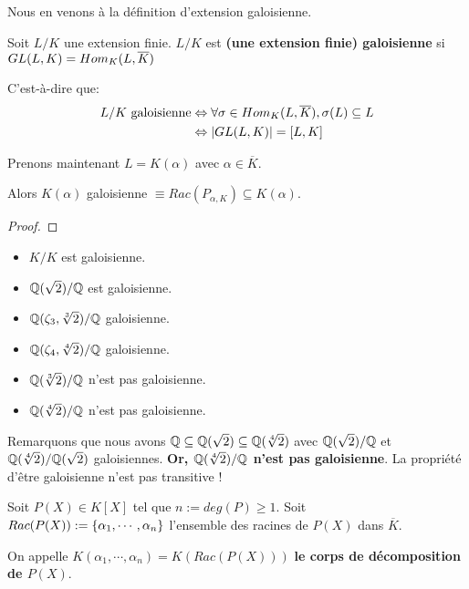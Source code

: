 Nous en venons à la définition d'extension galoisienne.

\begin{definition}
	Soit $L/K$ une extension finie.
	$L/K$ est \textbf{(une extension finie) galoisienne} si $GL(L, K) =
	Hom_{K}(L, \overline{K})$
\end{definition}

C'est-à-dire que:
\begin{align*}
	L/K \text{ galoisienne}
	& \Leftrightarrow \forall \sigma \in Hom_{K}(L, \overline{K}), \sigma(L) \subseteq L \\
	& \Leftrightarrow |GL(L, K)| = [L, K]
\end{align*}

\begin{proposition}
	Prenons maintenant $L = K(\alpha)$ avec $\alpha \in \overline{K}$.

	Alors $K(\alpha)$ galoisienne $\equiv Rac(P_{\alpha, K}) \subseteq K(\alpha)$.
\end{proposition}

\ifdefined\outputproof
\begin{proof}

\end{proof}
\fi

\begin{exemple} [Exercice]
	\begin{itemize}
		\item $K/K$ est galoisienne.
		\item $\mathbb{Q}(\sqrt{2})/\mathbb{Q}$ est galoisienne.
		\item $\mathbb{Q}(\zeta_{3}, \sqrt[3]{2})/\mathbb{Q}$ galoisienne.
		\item $\mathbb{Q}(\zeta_{4}, \sqrt[4]{2})/\mathbb{Q}$ galoisienne.
		\item $\mathbb{Q}(\sqrt[3]{2})/\mathbb{Q}$ n'est pas galoisienne.
		\item $\mathbb{Q}(\sqrt[4]{2})/\mathbb{Q}$ n'est pas galoisienne.
	\end{itemize}
\end{exemple}

Remarquons que nous avons $\mathbb{Q} \subseteq \mathbb{Q}(\sqrt{2}) \subseteq
\mathbb{Q}(\sqrt[4]{2})$ avec $\mathbb{Q}(\sqrt{2})/\mathbb{Q}$ et
$\mathbb{Q}(\sqrt[4]{2})/\mathbb{Q}(\sqrt{2})$ galoisiennes.
\textbf{Or, $\mathbb{Q}(\sqrt[4]{2})/\mathbb{Q}$ n'est pas galoisienne}. La
propriété d'être galoisienne n'est pas transitive !

\begin{definition}
	Soit $P(X) \in K[X]$ tel que $n := deg(P) \geq 1$. Soit $Rac(P(X)) :=
	\left\{ \alpha_{1}, \cdots, \alpha_{n} \right\}$ l'ensemble
	des racines de $P(X)$ dans $\overline{K}$.

	On appelle $K(\alpha_{1}, \cdots, \alpha_{n}) = K(Rac(P(X)))$ \textbf{le
	corps de décomposition de $P(X)$}.
\end{definition}

